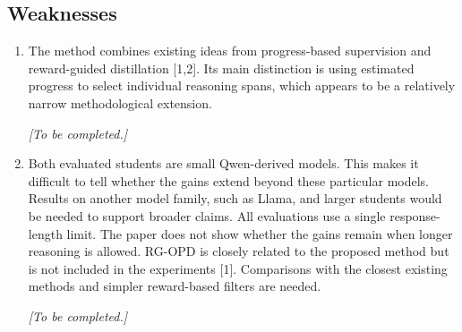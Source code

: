 \documentclass[11pt,a4paper]{article}
\begin{document}
\subsection*{Weaknesses}
\begin{enumerate}
\item The method combines existing ideas from progress-based supervision and reward-guided distillation [1,2]. Its main distinction is using estimated progress to select individual reasoning spans, which appears to be a relatively narrow methodological extension.
\par{}
\begin{responsebox}[frametitle={Response to W1},nobreak=true]
\textit{[To be completed.]}\par\vspace{1em}
\end{responsebox}

\item Both evaluated students are small Qwen-derived models. This makes it difficult to tell whether the gains extend beyond these particular models. Results on another model family, such as Llama, and larger students would be needed to support broader claims. All evaluations use a single response-length limit. The paper does not show whether the gains remain when longer reasoning is allowed. RG-OPD is closely related to the proposed method but is not included in the experiments [1]. Comparisons with the closest existing methods and simpler reward-based filters are needed.
\par{}
\begin{responsebox}[frametitle={Response to W2},nobreak=true]
\textit{[To be completed.]}\par\vspace{1em}
\end{responsebox}


\end{enumerate}
\end{document}
